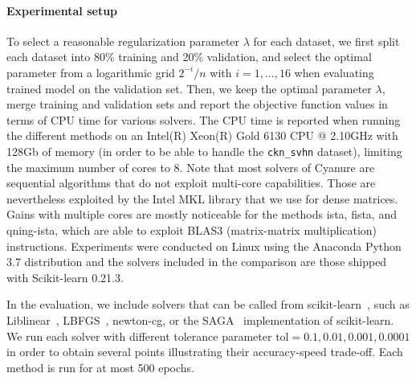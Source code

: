 \documentclass{article}
\begin{document}
\paragraph{Experimental setup}
To select a reasonable regularization parameter $\lambda$ for each dataset, we first split each dataset into 80\% training and 20\% validation, and select the optimal parameter from a logarithmic grid $2^{-i}/n$ with $i=1,\ldots,16$ when evaluating trained model on the validation set. Then, we keep the optimal parameter $\lambda$, merge training and validation sets and report the objective function values in terms of CPU time for various solvers. The CPU time is reported when running the different methods on an Intel(R) Xeon(R) Gold 6130 CPU @ 2.10GHz with 128Gb of memory (in order to be able to handle the \texttt{ckn\_svhn} dataset), limiting the maximum number of cores to 8. Note that most solvers of Cyanure are sequential algorithms that do not exploit multi-core capabilities. Those are nevertheless exploited by the Intel MKL library that we use for dense matrices. Gains with multiple cores are mostly noticeable for the methods ista, fista, and qning-ista, which are able to exploit BLAS3 (matrix-matrix multiplication) instructions.
Experiments were conducted on Linux using the Anaconda Python 3.7 distribution and the solvers included in the comparison are those shipped with Scikit-learn 0.21.3.

In the evaluation, we include solvers that can be called from scikit-learn~\cite{scikit}, such as Liblinear~\cite{fan2008liblinear}, LBFGS~\cite{lbfgs}, newton-cg, or the SAGA~\cite{saga} implementation of scikit-learn. We run each solver with different tolerance parameter $\text{tol}=0.1,0.01,0.001,0.0001$ in order to obtain several points illustrating their accuracy-speed trade-off. Each method is run for at most 500 epochs.
\end{document}
